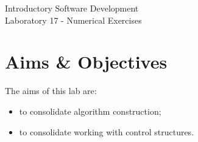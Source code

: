 \documentclass[12pt,oneside]{cttutorial}
\begin{document}
\tutorialextra{}


 

\newcommand{\xkcd}[2]{
	\begin{center}
	\texttt{[image: ../../Figures/png/\#1]}
	\newline
	\url{http://xkcd.com/#2}
	\end{center}
	\bigskip
}

\newcommand{\alert}[1]
{\marginpar
  {\makebox[0 pt][l]
    {\texttt{[image: ../../Figures/png/warning.png]}
  }
  \parbox{2 cm}{{\sffamily \bfseries \tiny #1}}}}


\renewcommand{\baselinestretch}{1.5}
\textwidth=15cm

\newcommand{\I}{j}

\begin{center}
\begin{bfseries}
Introductory Software Development\\Laboratory 17 - Numerical Exercises
\end{bfseries}
\end{center}

\section{Aims \& Objectives}

The aims of this lab are:

\begin{itemize}
\item to consolidate algorithm construction;
\item to consolidate working with control structures.
\end{itemize}
\end{document}
